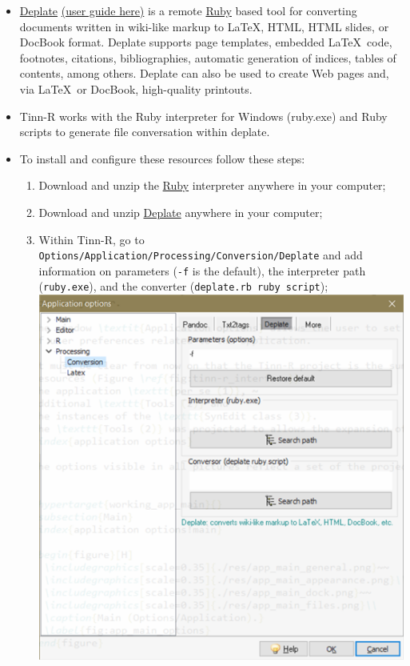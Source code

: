 \begin{itemize}
  \item \href{http://deplate.sourceforge.net/}{Deplate}
    \href{http://deplate.sourceforge.net/deplate.html}{(user guide here)}
    is a remote
    \href{http://www.ruby-lang.org/en/}{Ruby} based tool for
    converting documents written in wiki-like markup to \LaTeX, HTML, HTML slides,
    or DocBook format. Deplate supports page templates, embedded \LaTeX ~code,
    footnotes, citations, bibliographies, automatic generation of indices, tables
    of contents, among others. Deplate can also be used to create Web pages and,
    via \LaTeX ~or DocBook, high-quality printouts.

  \item Tinn-R works with the Ruby interpreter for Windows (ruby.exe) and Ruby
    scripts to generate file conversation within deplate.

  \item To install and configure these resources follow these steps:
    \begin{enumerate}
      \item Download and unzip the
        \href{http://www.ruby-lang.org/en/}{Ruby}
        interpreter anywhere in your computer;
      \item Download and unzip
        \href{http://deplate.sourceforge.net/Download.php}{Deplate}
        anywhere in your computer;
      \item Within Tinn-R, go to \texttt{Options/Application/Processing/Conversion/Deplate}
        and add information on parameters (\texttt{-f} is the default),
        the interpreter path (\texttt{ruby.exe}), and the converter
        (\texttt{deplate.rb ruby script});\\

        \includegraphics[scale=1]{./res/app_processing_conversion_deplate.png}\\
    \end{enumerate}
\end{itemize}

